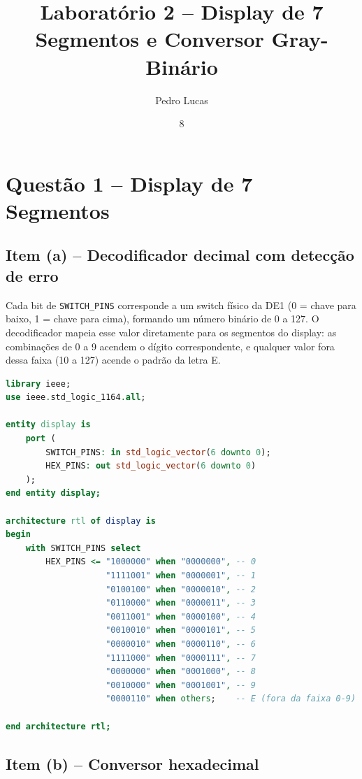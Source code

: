 \documentclass[report, 12pt]{uftreport}
\title{Laboratório 2 -- Display de 7 Segmentos e Conversor Gray-Binário}
\author{Pedro Lucas}{Moreira}
\date{8}{9}{2026}
\begin{document}
\frontmatter
\maketitle
\makefrontpage

\mainmatter
{}

\chapter{Questão 1 -- Display de 7 Segmentos}

\section{Item (a) -- Decodificador decimal com detecção de erro}

Cada bit de \texttt{SWITCH\_PINS} corresponde a um switch físico da DE1 (0 = chave para baixo, 1 = chave para cima), formando um número binário de 0 a 127. O decodificador mapeia esse valor diretamente para os segmentos do display: as combinações de 0 a 9 acendem o dígito correspondente, e qualquer valor fora dessa faixa (10 a 127) acende o padrão da letra E.

\begin{lstlisting}[language=VHDL]
library ieee;
use ieee.std_logic_1164.all;

entity display is
    port (
        SWITCH_PINS: in std_logic_vector(6 downto 0);
        HEX_PINS: out std_logic_vector(6 downto 0)
    );
end entity display;

architecture rtl of display is
begin
    with SWITCH_PINS select
        HEX_PINS <= "1000000" when "0000000", -- 0
                    "1111001" when "0000001", -- 1
                    "0100100" when "0000010", -- 2
                    "0110000" when "0000011", -- 3
                    "0011001" when "0000100", -- 4
                    "0010010" when "0000101", -- 5
                    "0000010" when "0000110", -- 6
                    "1111000" when "0000111", -- 7
                    "0000000" when "0001000", -- 8
                    "0010000" when "0001001", -- 9
                    "0000110" when others;    -- E (fora da faixa 0-9)

end architecture rtl;
\end{lstlisting}

\section{Item (b) -- Conversor hexadecimal}
\end{document}
